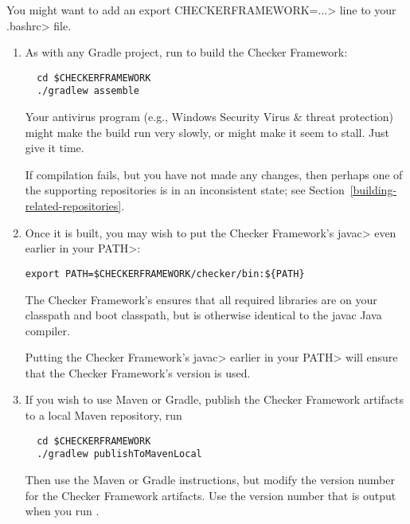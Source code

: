 You might want to add an \<export CHECKERFRAMEWORK=...> line to your
\<.bashrc> file.




\begin{enumerate}

\item
As with any Gradle project, run  to build the Checker Framework:

\begin{Verbatim}
  cd $CHECKERFRAMEWORK
  ./gradlew assemble
\end{Verbatim}

\noindent
Your antivirus program (e.g., Windows Security Virus \& threat protection)
might make the build run very slowly, or might make it seem to stall.  Just
give it time.

If compilation fails, but you have not made any changes, then perhaps one
of the supporting repositories is in an inconsistent state; see
Section~\ref{building-related-repositories}.

\item
Once it is built, you may wish to put the Checker Framework's \<javac>
even earlier in your \<PATH>:

\begin{Verbatim}
export PATH=$CHECKERFRAMEWORK/checker/bin:${PATH}
\end{Verbatim}

The Checker Framework's  ensures that all required
libraries are on your classpath and boot classpath, but is otherwise
identical to the javac Java compiler.

Putting the Checker Framework's \<javac> earlier in your \<PATH> will
ensure that the Checker Framework's version is used.

\item
If you wish to use Maven or Gradle, publish the Checker Framework artifacts to a local Maven repository, run
\begin{Verbatim}
  cd $CHECKERFRAMEWORK
  ./gradlew publishToMavenLocal
\end{Verbatim}
Then use the Maven or Gradle instructions, but modify the version number for the Checker Framework artifacts.
Use the version number that is output when you run .


\end{enumerate}
